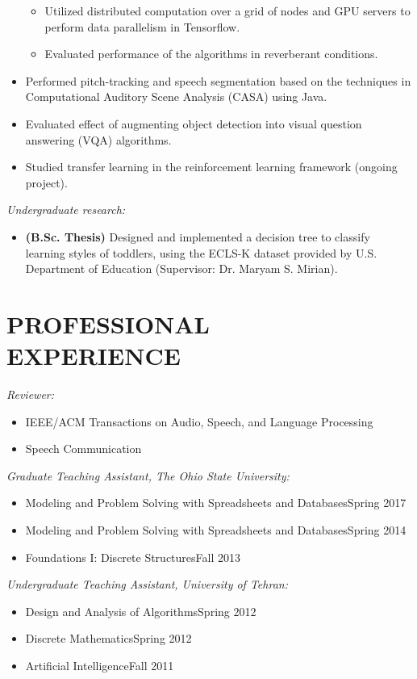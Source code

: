 \documentclass[margin, 10pt]{res}
\begin{document}
\begin{resume}
\begin{itemize}
\begin{itemize}
	\item Utilized distributed computation over a grid of nodes and GPU servers to perform data parallelism in Tensorflow.
	\item Evaluated performance of the algorithms in reverberant conditions.
	\end{itemize}
\item Performed pitch-tracking and speech segmentation based on the techniques in Computational Auditory Scene Analysis (CASA) using Java.
\item Evaluated effect of augmenting object detection into visual question answering (VQA) algorithms.
\item Studied transfer learning in the reinforcement learning framework (ongoing project).
\end{itemize}
\textit{Undergraduate research:}
\begin{itemize}\setlength\itemsep{-0.3em}
\item \textbf{(B.Sc. Thesis)} Designed and implemented a decision tree to classify learning styles of toddlers, using the ECLS-K dataset provided by U.S. Department of Education (Supervisor: Dr. Maryam S. Mirian).
\end{itemize}
\section{PROFESSIONAL\\EXPERIENCE}
\textit{Reviewer:}
\begin{itemize}\setlength\itemsep{-0.3em}
\item IEEE/ACM Transactions on Audio, Speech, and Language Processing
\item Speech Communication
\end{itemize}
\textit{Graduate Teaching Assistant, The Ohio State University:}
\begin{itemize}\setlength\itemsep{-0.3em}
\item Modeling and Problem Solving with Spreadsheets and Databases\hfill {\footnotesize Spring 2017}
\item Modeling and Problem Solving with Spreadsheets and Databases\hfill {\footnotesize Spring 2014}
\item Foundations I: Discrete Structures\hfill {\footnotesize Fall 2013}
\end{itemize}
\textit{Undergraduate Teaching Assistant, University of Tehran:}
\begin{itemize}\setlength\itemsep{-0.3em}
\item Design and Analysis of Algorithms\hfill {\footnotesize Spring 2012}
\item Discrete Mathematics\hfill {\footnotesize Spring 2012}
\item Artificial Intelligence\hfill {\footnotesize Fall 2011}
\end{itemize}


\end{resume}
\end{document}
